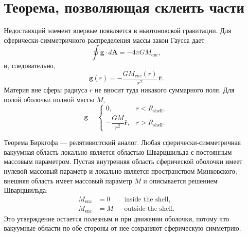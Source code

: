 \section{Теорема, позволяющая склеить части}

Недостающий элемент впервые появляется в ньютоновской гравитации. Для сферически-симметричного распределения массы закон Гаусса дает
\begin{equation}
\oint\mathbf g\cdot d\mathbf A=-4\pi G M_{\mathrm{enc}},
\end{equation}
и, следовательно,
\begin{equation}
\mathbf g(r)=-\frac{G M_{\mathrm{enc}}(r)}{r^2}\,\hat{\mathbf r}.
\label{eq:l05-shell-theorem}
\end{equation}
Материя вне сферы радиуса \(r\) не вносит туда никакого суммарного поля. Для полой оболочки полной массы \(M\),
\begin{equation}
\mathbf g=
\begin{cases}
0, & r<R_{\mathrm{shell}},\\[3pt]
-\dfrac{GM}{r^2}\hat{\mathbf r}, & r>R_{\mathrm{shell}}.
\end{cases}
\end{equation}

Теорема Биркгофа — релятивистский аналог. Любая сферически-симметричная вакуумная область локально является областью Шварцшильда с постоянным массовым параметром. Пустая внутренняя область сферической оболочки имеет нулевой массовый параметр и локально является пространством Минковского; внешняя область имеет массовый параметр \(M\) и описывается решением Шварцшильда:
\begin{equation}
\begin{aligned}
M_{\mathrm{enc}}&=0 && \text{inside the shell},\\
M_{\mathrm{enc}}&=M && \text{outside the shell}.
\end{aligned}
\label{eq:l05-birkhoff}
\end{equation}
Это утверждение остается полезным и при движении оболочки, потому что вакуумные области по обе стороны от нее сохраняют сферическую симметрию.


